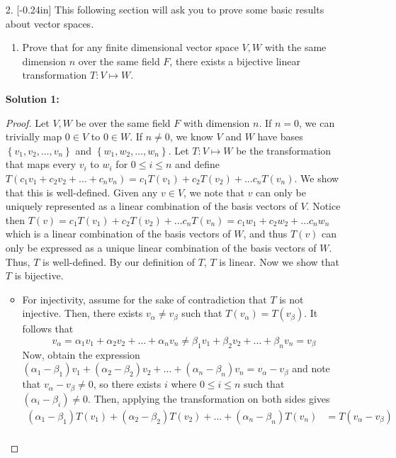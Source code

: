 \documentclass[letterpaper,12pt]{article}
\newcommand{\set}[1]{\left\{ #1 \right\}}
\theoremstyle{definition}
\begin{document}
\begin{enumerate}
    \item[2. ]\reversemarginpar{}[-0.24in] This following section will ask you to prove some basic results about vector spaces. \begin{enumerate}
        \item Prove that for any finite dimensional vector space $V,W$ with the same dimension $n$ over the same field $F$, there exists a bijective linear transformation $T: V \mapsto W$.
    \end{enumerate}
    \begin{mdframed}
            \textbf{Solution 1:  }
            \begin{proof}
             Let $V,W$ be over the same field $F$ with dimension $n$. If $n = 0$, we can trivially map $0 \in V$ to $0 \in W$. If $n\neq 0$, we know $V$ and $W$ have bases $\set{v_1,v_2,\ldots,v_n}$ and $\set{w_1,w_2,\ldots,w_n}$. Let $T:V \mapsto W$ be the transformation that maps every $v_i$ to $w_i$ for $0 \leq i \leq n$ and define $T(c_1v_1 + c_2v_2 + \ldots + c_nv_n) = c_1T(v_1) + c_2T(v_2) + \ldots c_nT(v_n)$. We show that this is well-defined. Given any $v \in V$, we note that $v$ can only be uniquely represented as a linear combination of the basis vectors of $V$. Notice then $T(v) =  c_1T(v_1) + c_2T(v_2) + \ldots c_nT(v_n) = c_1w_1 + c_2w_2 + \ldots c_nw_n$ which is a linear combination of the basis vectors of $W$, and thus $T(v)$ can only be expressed as a unique linear combination of the basis vectors of $W$. Thus, $T$ is well-defined. By our definition of $T$, $T$ is linear. Now we show that $T$ is bijective. \begin{itemize}
                 \item For injectivity, assume for the sake of contradiction that $T$ is not injective. Then, there exists $v_\alpha \neq v_\beta$ such that $T(v_\alpha) = T(v_\beta)$. It follows that $$v_\alpha = {\alpha}_1 v_1 + {\alpha}_2 v_2 + \ldots + {\alpha}_n v_n \neq {\beta}_1 v_1 + {\beta}_2 v_2 + \ldots + {\beta}_n v_n = v_\beta$$ Now, obtain the expression $({\alpha}_1 - {\beta}_1) v_1 + ({\alpha}_2 - {\beta}_2)v_2 + \ldots + ({\alpha}_n - {\beta}_n)v_n = v_\alpha - v_\beta$ and note that $ v_\alpha - v_\beta \neq 0$, so there exists $i$ where $0 \leq i \leq n$ such that $({\alpha}_i - {\beta}_i) \neq 0$. Then, applying the transformation on both sides gives 
                 \begin{align*}
                     ({\alpha}_1 - {\beta}_1)T( v_1) + ({\alpha}_2 - {\beta}_2)T(v_2) + \ldots + ({\alpha}_n - {\beta}_n)T(v_n) &= T(v_\alpha - v_\beta) \\

\end{align*}
\end{itemize}
\end{proof}
\end{mdframed}
\end{enumerate}
\end{document}
